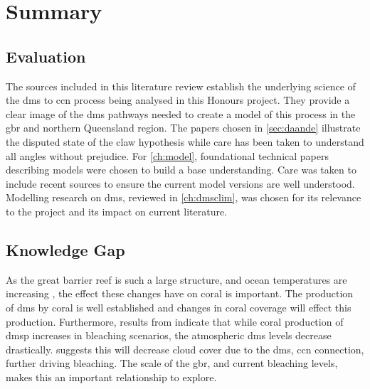\chapter{Summary}
\label{ch:summ}


\section{Evaluation}
\label{sec:eval}

	The sources included in this literature review establish the underlying science of the \gls{dms} to \gls{ccn} process being analysed in this Honours project. They provide a clear image of the \gls{dms} pathways needed to create a model of this process in the \gls{gbr} and northern Queensland region. The papers chosen in \cref{sec:daande} illustrate the disputed state of the \gls{claw} hypothesis while care has been taken to understand all angles without prejudice. For \cref{ch:model}, foundational technical papers describing models were chosen to build a base understanding. Care was taken to include recent sources to ensure the current model versions are well understood. Modelling research on \gls{dms}, reviewed in \cref{ch:dmsclim}, was chosen for its relevance to the project and its impact on current literature.


\section{Knowledge Gap}
\label{sec:knowgap}

	As the great barrier reef is such a large structure, and ocean temperatures are increasing \citep{hoeghguldberg:1999bi}, the effect these changes have on coral is important. The production of \gls{dms} by coral is well established \citep{jones:2005ez,fischer2012atmospheric} and changes in coral coverage will effect this production. Furthermore, results from \citet{fischer2012atmospheric} indicate that while coral production of \gls{dmsp} increases in bleaching scenarios, the atmospheric \gls{dms} levels decrease drastically. \citet{fischer2012atmospheric} suggests this will decrease cloud cover due to the \gls{dms}, \gls{ccn} connection, further driving bleaching. The scale of the \gls{gbr}, and current bleaching levels, makes this an important relationship to explore.

